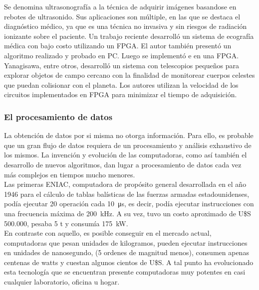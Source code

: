 Se denomina ultrasonografía a la técnica de adquirir imágenes basandose en rebotes de ultrasonido. Sus aplicaciones son múltiple, en las que se destaca el diagnóstico médico, ya que es una técnica no invasiva y sin riesgos de radiación ionizante sobre el paciente. Un trabajo reciente desarrolló un sistema de ecografía médica con bajo costo utilizando un FPGA\cite{biswas2018embedded}. El autor también presentó un algoritmo realizado y probado en PC. Luego se implementó e en una FPGA.\\

Yanagisawa, entre otros, desarrolló un sistema con telescopios pequeños para explorar objetos de campo cercano con la finalidad de monitorear cuerpos celestes que puedan colisionar con el planeta\cite{Yanagisawa2018}. Los autores utilizan la velocidad de los circuitos implementados en FPGA para minimizar el tiempo de adquisición.


\subsubsection*{El procesamiento de datos}
La obtención de datos por si misma no otorga información. Para ello, es probable que un gran flujo de datos requiera de un procesamiento y análisis exhaustivo de los mismos. La invención y evolución de las computadoras, como así también el desarrollo de nuevos algoritmos, dan lugar a procesamiento de datos cada vez más complejos en tiempos mucho menores.\\

Las primeras ENIAC, computadora de propósito general desarrollada en el año 1946 para el cálculo de tablas balísticas de las fuerzas armadas estadounidenses, podía ejecutar 20 operación cada \SI{10}{\micro\second}, es decir, podía ejecutar instrucciones con una frecuencia máxima de \SI{200}{\kilo\hertz}. A su vez, tuvo un costo aproximado de U\$S 500.000, pesaba 5 t y consumía \SI{175}{\kilo\watt}.\\

En contraste con aquello, es posible conseguir en el mercado actual, computadoras que pesan unidades de kilogramos, pueden ejecutar instrucciones en unidades de nanosegundo, (5 ordenes de magnitud menos), consumen apenas centenas de watts y cuestan algunos cientos de U\$S. A tal punto ha evolucionado esta tecnología que se encuentran presente computadoras muy potentes en casi cualquier laboratorio, oficina u hogar.\\

